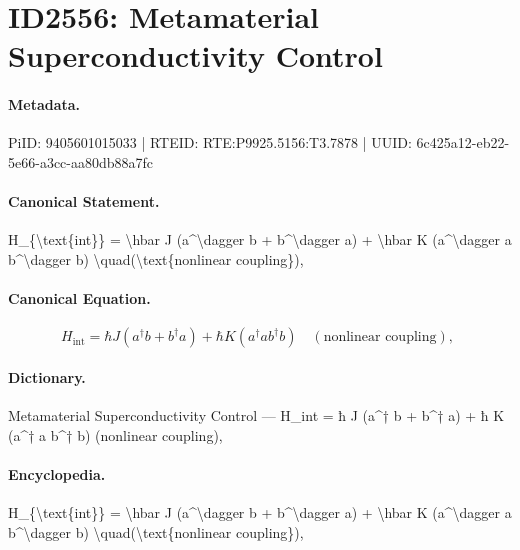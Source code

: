 \section*{ID2556: Metamaterial Superconductivity Control}
\paragraph{Metadata.}
PiID: 9405601015033 | RTEID: RTE:P9925.5156:T3.7878 | UUID: 6c425a12-eb22-5e66-a3cc-aa80db88a7fc

\paragraph{Canonical Statement.}
H\_\{\textbackslash{}text\{int\}\} = \textbackslash{}hbar J (a\textasciicircum{}\textbackslash{}dagger b + b\textasciicircum{}\textbackslash{}dagger a) + \textbackslash{}hbar K (a\textasciicircum{}\textbackslash{}dagger a b\textasciicircum{}\textbackslash{}dagger b) \textbackslash{}quad(\textbackslash{}text\{nonlinear coupling\}), 

\paragraph{Canonical Equation.}
\[
H_{\text{int}} = \hbar J (a^\dagger b + b^\dagger a) + \hbar K (a^\dagger a b^\dagger b) \quad(\text{nonlinear coupling}), 
\]

\paragraph{Dictionary.}
Metamaterial Superconductivity Control — H\_int = ħ J (a\textasciicircum{}† b + b\textasciicircum{}† a) + ħ K (a\textasciicircum{}† a b\textasciicircum{}† b) (nonlinear coupling), 

\paragraph{Encyclopedia.}
H\_\{\textbackslash{}text\{int\}\} = \textbackslash{}hbar J (a\textasciicircum{}\textbackslash{}dagger b + b\textasciicircum{}\textbackslash{}dagger a) + \textbackslash{}hbar K (a\textasciicircum{}\textbackslash{}dagger a b\textasciicircum{}\textbackslash{}dagger b) \textbackslash{}quad(\textbackslash{}text\{nonlinear coupling\}), 
